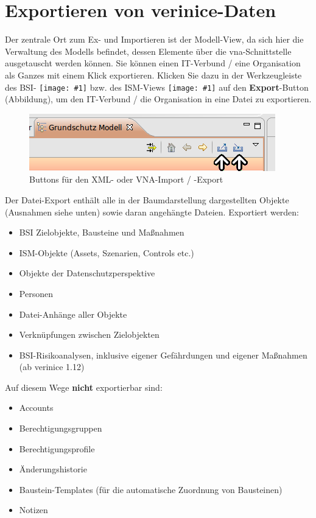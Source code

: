 \documentclass[a4paper,10pt]{book}
\newcommand{\icon}[1]{\texttt{[image: \#1]}}
\begin{document}
\section{Exportieren von verinice-Daten} \label{Exportieren von verinice-Daten}
Der zentrale Ort zum Ex- und Importieren ist der Modell-View, da sich hier die Verwaltung des Modells befindet, dessen Elemente über die vna-Schnittstelle ausgetauscht werden können.
Sie können einen IT-Verbund / eine Organisation als Ganzes mit einem Klick exportieren. Klicken Sie dazu in der Werkzeugleiste des BSI-
\icon{Icon/GS_Modell.png} bzw. des ISM-Views \icon{Icon/Informationssicherheitsmodell.png} auf den
\textbf{Export}-Button (Abbildung), um den IT-Verbund / die Organisation in eine Datei zu exportieren.
\newline
\begin{figure}[htb!]
  \centering
  \includegraphics[scale=.7]{Screenshot/Import-export_buttons.png}
  \caption{\label{Buttons fuer den XML- oder VNA-Import / -Export} Buttons für den XML- oder VNA-Import / -Export}
\end{figure}
\newline
Der Datei-Export enthält alle in der Baumdarstellung dargestellten Objekte (Ausnahmen siehe unten) sowie daran angehängte Dateien.
\newline
Exportiert werden:
\begin{itemize}
 \item BSI Zielobjekte, Bausteine und Maßnahmen
 \item ISM-Objekte (Assets, Szenarien, Controls etc.)
 \item Objekte der Datenschutzperspektive
 \item Personen
 \item Datei-Anhänge aller Objekte
 \item Verknüpfungen zwischen Zielobjekten
 \item BSI-Risikoanalysen, inklusive eigener Gefährdungen und eigener
   Maßnahmen (ab verinice 1.12)
\end{itemize}
Auf diesem Wege \textbf{nicht} exportierbar sind:
\begin{itemize}
 \item Accounts
 \item Berechtigungsgruppen
 \item Berechtigungsprofile
 \item Änderungshistorie
 \item Baustein-Templates (für die automatische Zuordnung von Bausteinen)
 \item Notizen
\end{itemize}
\end{document}
